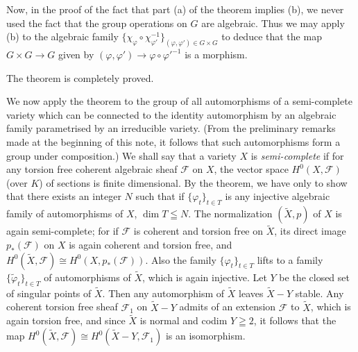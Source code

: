 Now, in the proof of the fact that part (a) of the theorem implies (b), we never used the fact that the group operations on $G$ are algebraic. Thus we may apply (b) to the algebraic family $\{\chi_\varphi \circ \chi_{\varphi'}^{-1}\}_{(\varphi, \varphi') \in G \times G }$ to deduce that the map $G \times G \to G$ given by $(\varphi, \varphi') \to \varphi \circ \varphi'^{-1}$ is a morphism.

The theorem is completely proved.

We now apply the theorem to the group of all automorphisms of a semi-complete variety which can be connected to the identity automorphism by an algebraic family parametrised by an irreducible variety. (From the preliminary remarks made at the beginning of this note, it follows that such automorphisms form a group under composition.) We shall say that a variety $X$ is {\em semi-complete} if for any torsion free coherent algebraic sheaf $\mathscr{F}$ on $X$, the vector space $H^0 (X, \mathscr{F})$ (over $K$) of sections is finite dimensional. By the theorem, we have only to show that there exists an integer $N$ such that if $\{\varphi_t\}_{t \in T}$ is any injective algebraic family of automorphisms of $X$, $\dim T \leqq N$. The normalization $(\tilde{X}, p)$ of $X$ is again semi-complete; for if $\mathscr{F}$ is coherent and torsion free on $\tilde{X}$, its direct image $p_* (\mathscr{F})$ on $X$ is again coherent and torsion free, and $H^0(\tilde{X}, \mathscr{F}) \cong H^0 (X, p_* (\mathscr{F}))$. Also the family $\{\varphi_t\}_{t \in T}$ lifts to a family $\{\tilde{\varphi}_t\}_{t \in T}$ of automorphisms of $\tilde{X}$, which is again injective. Let $Y$ be the closed set of singular points of $\tilde{X}$. Then any automorphism of $\tilde{X}$ leaves $\tilde{X} - Y$ stable. Any coherent torsion free sheaf $\mathscr{F}_1$ on $\tilde{X} - Y$ admits of an extension $\mathscr{F}$ to $\tilde{X}$, which is again torsion free, and since $\tilde{X}$ is normal and codim $Y \geqq 2$, it follows that the map $H^0 (\tilde{X}, \mathscr{F}) \cong H^0 (\tilde{X} - Y, \mathscr{F}_1)$ is an isomorphism.


